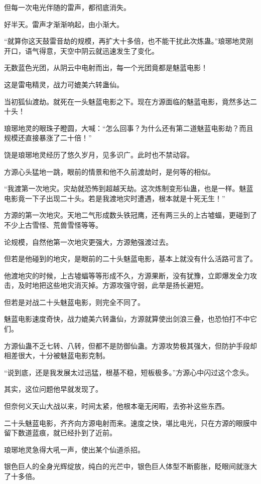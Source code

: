 \begin{this_body}
但每一次电光伴随的雷声，都彻底消失。

好半天。雷声才渐渐响起，由小渐大。

“就算你这天鼓雷音劫的规模，再扩大十多倍，也不能干扰此次炼蛊。”琅琊地灵刚开口，语气得意，天空中阴云就迅速发生了变化。

无数蓝色光团，从阴云中电射而出，每一个光团竟都是魅蓝电影！

这是雷电精灵，战力可媲美六转蛊仙。

当初狐仙渡劫。就死在一头魅蓝电影之下。现在方源面临的魅蓝电影，竟然多达二十头！

琅琊地灵的眼珠子瞪圆，大喊：“怎么回事？为什么还有第二道魅蓝电影劫？而且规模还直接暴涨了二十倍！”

饶是琅琊地灵经历了悠久岁月，见多识广。此时也不禁动容。

方源心头猛地一跳，眼前的情景和他不久前渡劫时，是何等的相似。

“我渡第一次地灾。灾劫就恐怖到超越天劫。这次炼制变形仙蛊，也是一样。魅蓝电影竟一下子出现二十头。若是我渡地灾时遭遇，根本就是十死无生！”

方源的第一次地灾。天地二气形成数头铁冠鹰，还有两三头的上古墟蝠，更碰到了不少上古雪怪、荒兽雪怪等等。

论规模，自然他第一次地灾更强大，方源勉强渡过去。

但若是他碰到的地灾，是眼前的二十头魅蓝电影，基本上就没有什么活路可言了。

他渡地灾的时候，上古墟蝠等等形成不久，方源果断，没有犹豫，立即爆发全力攻击，及时地把这些地灾消灭掉。方源攻强守弱，此举是扬长避短。

但若是对战二十头魅蓝电影，则完全不同了。

魅蓝电影速度奇快，战力媲美六转蛊仙，方源就算使出剑浪三叠，也恐怕打不中它们。

方源仙蛊不乏七转、八转，但都不是防御仙蛊。方源攻势极其强大，但防护手段却相差很大，十分被魅蓝电影克制。

“说到底，还是我发展太过迅猛，根基不稳，短板极多。”方源心中闪过这个念头。

其实，这位问题他早就发现了。

但奈何义天山大战以来，时间太紧，他根本毫无闲暇，去弥补这些东西。

二十头魅蓝电影，齐齐向方源电射而来。速度之快，堪比电光，只在方源的眼膜中留下数道蓝痕，就已经扑到了近前。

琅琊地灵急得大吼一声，使出某个仙道杀招。

银色巨人的全身光辉绽放，纯白的光芒中，银色巨人体型不断膨胀，眨眼间就涨大了十多倍。


\end{this_body}
